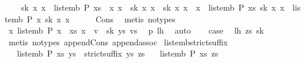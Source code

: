 \begin{isabellebody}
\ \ \ \ sk{\isacharcolon}\ {\isachardoublequoteopen}{\isasymforall}x\ x\ {\isasymnot}\ list{\isacharunderscore}emb\ P\ {\isacharparenleft}xs\ {\isacharat}\ x\ x\ {\isasymor}\ sk\ x\ x\ {\isacharat}\ sk\ x\ x\ {\isacharequal}\ x\ {\isasymand}\ list{\isacharunderscore}emb\ P\ xs\ {\isacharparenleft}sk\ x\ x\ {\isasymand}\ list{\isacharunderscore}emb\ P\ x\ {\isacharparenleft}sk\ x\ x\isanewline
\ \ \ \ \isamarkupfalse%
\ Cons{\isacharparenleft}{}{\isacharparenright}\ \isamarkupfalse%
\ {\isacharparenleft}metis\ {\isacharparenleft}no{\isacharunderscore}types{\isacharparenright}{\isacharparenright}\isanewline
\ \ \isamarkupfalse%
\ {\isachardoublequoteopen}{\isasymforall}x\ list{\isacharunderscore}emb\ P\ {\isacharparenleft}x\ {\isacharhash}\ xs{\isacharparenright}\ {\isacharparenleft}x\ {\isacharat}\ v\ {\isacharhash}\ sk\ ys\ vs{\isacharparenright}{\isachardoublequoteclose}\ \isamarkupfalse%
\ p\ lh\ \isamarkupfalse%
\ auto\isanewline
\ \ \isamarkupfalse%
\ {\isacharquery}case\ \isamarkupfalse%
\ lh\ zs\ sk\ \isamarkupfalse%
\ {\isacharparenleft}metis\ {\isacharparenleft}no{\isacharunderscore}types{\isacharparenright}\ append{\isacharunderscore}Cons\ append{\isacharunderscore}assoc{\isacharparenright}\isanewline
{}\isamarkupfalse%
%
\endisatagproof
{\isafoldproof}%
%
\isadelimproof
\isanewline
%
\endisadelimproof
\isanewline
{}\isamarkupfalse%
\ list{\isacharunderscore}emb{\isacharunderscore}strict{\isacharunderscore}suffix{\isacharcolon}\isanewline
\ \ \ {\isachardoublequoteopen}list{\isacharunderscore}emb\ P\ xs\ ys{\isachardoublequoteclose}\ \ {\isachardoublequoteopen}strict{\isacharunderscore}suffix\ ys\ zs{\isachardoublequoteclose}\isanewline
\ \ \ {\isachardoublequoteopen}list{\isacharunderscore}emb\ P\ xs\ zs{\isachardoublequoteclose}\isanewline

\end{isabellebody}
